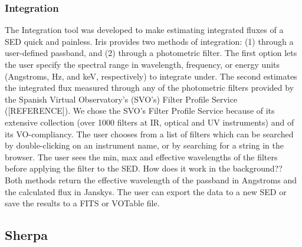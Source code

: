 \subsubsection{Integration}
The Integration tool was developed to make estimating integrated fluxes of a SED quick and painless. Iris provides two methods of integration: (1) through a user-defined passband, and (2) through a photometric filter. The first option lets the user specify the spectral range in wavelength, frequency, or energy units (Angstroms, Hz, and keV, respectively) to integrate under. The second estimates the integrated flux measured through any of the photometric filters provided by the Spanish Virtual Observatory's (SVO's) Filter Profile Service ([REFERENCE]). We chose the SVO's Filter Profile Service because of its extensive collection (over 1000 filters at IR, optical and UV instruments) and of its VO-compliancy. The user chooses from a list of filters which can be searched by double-clicking on an instrument name, or by searching for a string in the browser. The user sees the min, max and effective wavelengths of the filters before applying the filter to the SED.
How does it work in the background??
Both methods return the effective wavelength of the passband in Angstroms and the calculated flux in Janskys. The user can export the data to a new SED or save the results to a FITS or VOTable file.

\subsection{Sherpa}
\label{subsec:sherpa}



